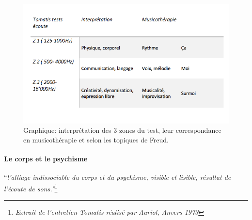 \begin{figure}
	\centering
	\includegraphics[width=0.7\linewidth]{images/testinterpmusico}
	\caption[ L'interprétation des 3 zones et leur correspondance
        en musicothérapie]{Graphique: interprétation des 3 zones du
          test, leur correspondance en musicothérapie et selon les
          topiques de Freud.}
       
	\label{graphiquecolonnetestmusico}
      \end{figure}


\paragraph{Le corps et le psychisme}

``\emph{l'alliage indissociable du corps et du psychisme, 
visible et lisible, résultat de l'écoute de sons.''}\footnote{\emph{Extrait de l'entretien Tomatis réalisé par Auriol, Anvers 1973}}










      


  
 	
 	
 	
 
       
   
 





      



 











   
 

  

  
  


